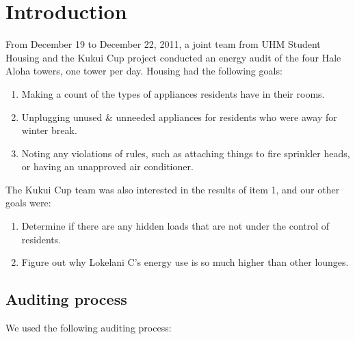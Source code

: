\documentclass[11pt,final]{article}
\begin{document}
\section{Introduction}

From December 19 to December 22, 2011, a joint team from UHM Student Housing and the Kukui Cup project conducted an energy audit of the four Hale Aloha towers, one tower per day. Housing had the following goals:

\begin{enumerate}
\item Making a count of the types of appliances residents have in their rooms.
\item Unplugging unused \& unneeded appliances for residents who were away for winter break.
\item Noting any violations of rules, such as attaching things to fire sprinkler heads, or having an unapproved air conditioner.
\end{enumerate}

The Kukui Cup team was also interested in the results of item 1, and our other goals were:

\begin{enumerate}[resume]
\item Determine if there are any hidden loads that are not under the control of residents.
\item Figure out why Lokelani C's energy use is so much higher than other lounges.
\end{enumerate}

\subsection{Auditing process}

We used the following auditing process:
\end{document}

